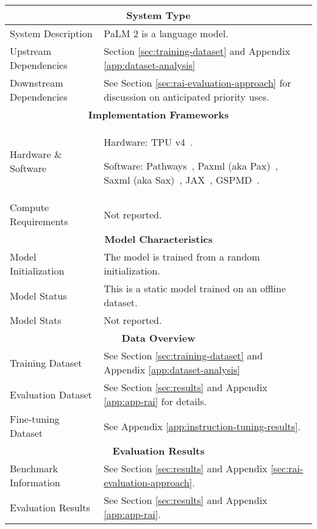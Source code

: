 \begin{longtable}[c]{ p{} | p{} }
\multicolumn{2}{c}{\textbf{System Type}}      \\ \toprule
\multicolumn{1}{l|}{System Description} & PaLM 2 is a language model.  \\ \midrule
\multicolumn{1}{l|}{Upstream Dependencies} & Section \ref{sec:training-dataset} and Appendix \ref{app:dataset-analysis}  \\ \midrule
\multicolumn{1}{l|}{Downstream Dependencies} & See Section \ref{sec:rai-evaluation-approach} for discussion on anticipated priority uses. \\
\toprule

\multicolumn{2}{c}{\textbf{Implementation Frameworks}}      \\ \toprule
\multicolumn{1}{l|}{Hardware \& Software} & Hardware: TPU v4~\citep{jouppi2020domain}.    \vspace{0.1in}

Software: Pathways~\citep{barham2022pathways}, Paxml (aka Pax)~\citep{pax2022pax}, Saxml (aka Sax)~\citep{sax2022sax}, JAX~\citep{jax2018github}, GSPMD~\citep{xu2021gspmd}. \vspace{0.1in}
\\ \midrule


\multicolumn{1}{l|}{Compute Requirements} & Not reported. \\
\toprule

\multicolumn{2}{c}{\textbf{Model Characteristics}}      \\ \toprule
\multicolumn{1}{l|}{Model Initialization} & The model is trained from a random initialization.  \\ \midrule
\multicolumn{1}{l|}{Model Status} & This is a static model trained on an offline dataset.  \\ \midrule
\multicolumn{1}{l|}{Model Stats} & Not reported. \\
\toprule

\multicolumn{2}{c}{\textbf{Data Overview}}      \\ \toprule
\multicolumn{1}{l|}{Training Dataset} & See Section \ref{sec:training-dataset} and Appendix \ref{app:dataset-analysis}  \\ \midrule
\multicolumn{1}{l|}{Evaluation Dataset} & See Section \ref{sec:results} and Appendix \ref{app:app-rai} for details. \\ \midrule
\multicolumn{1}{l|}{Fine-tuning Dataset} & See Appendix \ref{app:instruction-tuning-results}. \\
\toprule

\multicolumn{2}{c}{\textbf{Evaluation Results}}      \\ \toprule
\multicolumn{1}{l|}{Benchmark Information} & See Section \ref{sec:results} and Appendix \ref{sec:rai-evaluation-approach}. \\ \midrule
\multicolumn{1}{l|}{Evaluation Results} & See Section \ref{sec:results} and Appendix \ref{app:app-rai}.    \\ 
\toprule


\end{longtable}

